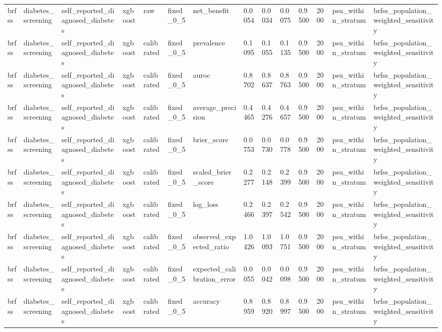 \begin{tabular}{llllllllllllll}
brfss & diabetes\_screening & self\_reported\_diagnosed\_diabetes & xgboost & raw & fixed\_0\_5 & net\_benefit & 0.0054 & 0.0034 & 0.0075 & 0.9500 & 2000 & psu\_within\_stratum & brfss\_population\_weighted\_sensitivity \\
brfss & diabetes\_screening & self\_reported\_diagnosed\_diabetes & xgboost & calibrated & fixed\_0\_5 & prevalence & 0.1095 & 0.1055 & 0.1135 & 0.9500 & 2000 & psu\_within\_stratum & brfss\_population\_weighted\_sensitivity \\
brfss & diabetes\_screening & self\_reported\_diagnosed\_diabetes & xgboost & calibrated & fixed\_0\_5 & auroc & 0.8702 & 0.8637 & 0.8763 & 0.9500 & 2000 & psu\_within\_stratum & brfss\_population\_weighted\_sensitivity \\
brfss & diabetes\_screening & self\_reported\_diagnosed\_diabetes & xgboost & calibrated & fixed\_0\_5 & average\_precision & 0.4465 & 0.4276 & 0.4657 & 0.9500 & 2000 & psu\_within\_stratum & brfss\_population\_weighted\_sensitivity \\
brfss & diabetes\_screening & self\_reported\_diagnosed\_diabetes & xgboost & calibrated & fixed\_0\_5 & brier\_score & 0.0753 & 0.0730 & 0.0778 & 0.9500 & 2000 & psu\_within\_stratum & brfss\_population\_weighted\_sensitivity \\
brfss & diabetes\_screening & self\_reported\_diagnosed\_diabetes & xgboost & calibrated & fixed\_0\_5 & scaled\_brier\_score & 0.2277 & 0.2148 & 0.2399 & 0.9500 & 2000 & psu\_within\_stratum & brfss\_population\_weighted\_sensitivity \\
brfss & diabetes\_screening & self\_reported\_diagnosed\_diabetes & xgboost & calibrated & fixed\_0\_5 & log\_loss & 0.2466 & 0.2397 & 0.2542 & 0.9500 & 2000 & psu\_within\_stratum & brfss\_population\_weighted\_sensitivity \\
brfss & diabetes\_screening & self\_reported\_diagnosed\_diabetes & xgboost & calibrated & fixed\_0\_5 & observed\_expected\_ratio & 1.0426 & 1.0093 & 1.0751 & 0.9500 & 2000 & psu\_within\_stratum & brfss\_population\_weighted\_sensitivity \\
brfss & diabetes\_screening & self\_reported\_diagnosed\_diabetes & xgboost & calibrated & fixed\_0\_5 & expected\_calibration\_error & 0.0055 & 0.0042 & 0.0098 & 0.9500 & 2000 & psu\_within\_stratum & brfss\_population\_weighted\_sensitivity \\
brfss & diabetes\_screening & self\_reported\_diagnosed\_diabetes & xgboost & calibrated & fixed\_0\_5 & accuracy & 0.8959 & 0.8920 & 0.8997 & 0.9500 & 2000 & psu\_within\_stratum & brfss\_population\_weighted\_sensitivity \\

\end{tabular}
